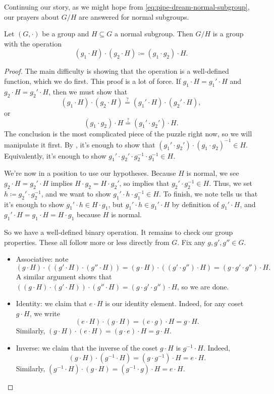 \documentclass[../main.tex]{subfiles}
\begin{document}
Continuing our story, as we might hope from \eqref{eq:pipe-dream-normal-subgroup}, our prayers about $G/H$ are answered for normal subgroups.
\begin{proposition}
    Let $(G,\cdot)$ be a group and $H\subseteq G$ a normal subgroup. Then $G/H$ is a group with the operation
    \[(g_1\cdot H)\cdot(g_2\cdot H)\coloneqq(g_1\cdot g_2)\cdot H.\]
\end{proposition}
\begin{proof}
    The main difficulty is showing that the operation is a well-defined function, which we do first. This proof is a lot of force. If $g_1\cdot H=g_1'\cdot H$ and $g_2\cdot H=g_2'\cdot H$, then we must show that
    \[(g_1\cdot H)\cdot(g_2\cdot H)\stackrel?=(g_1'\cdot H)\cdot(g_2'\cdot H),\]
    or
    \[(g_1\cdot g_2)\cdot H\stackrel?=(g_1'\cdot g_2')\cdot H.\]
    The conclusion is the most complicated piece of the puzzle right now, so we will manipulate it first. By , it's enough to show that $(g_1'\cdot g_2')\cdot(g_1\cdot g_2)^{-1}\in H$. Equivalently, it's enough to show $g_1'\cdot g_2'\cdot g_2^{-1}\cdot g_1^{-1}\in H$.
    
    We're now in a position to use our hypotheses. Because $H$ is normal, we see $g_2\cdot H=g_2'\cdot H$ implies $H\cdot g_2=H\cdot g_2'$, so  implies that $g_2'\cdot g_2^{-1}\in H$. Thus, we set $h\coloneqq g_2'\cdot g_2^{-1}$, and we want to show $g_1'\cdot h\cdot g_1^{-1}\in H$. To finish, we note  tells us that it's enough to show $g_1'\cdot h\in H\cdot g_1$, but $g_1'\cdot h\in g_1'\cdot H$ by definition of $g_1'\cdot H$, and $g_1'\cdot H=g_1\cdot H=H\cdot g_1$ because $H$ is normal.
    
    So we have a well-defined binary operation. It remains to check our group properties. These all follow more or less directly from $G$. Fix any $g,g',g''\in G$.
    \begin{itemize}
        \item Associative: note
        \[(g\cdot H)\cdot((g'\cdot H)\cdot(g''\cdot H))=(g\cdot H)\cdot((g'\cdot g'')\cdot H)=(g\cdot g'\cdot g'')\cdot H.\]
        A similar argument shows that $((g\cdot H)\cdot(g'\cdot H))\cdot(g''\cdot H)=(g\cdot g'\cdot g'')\cdot H$, so we are done.
        \item Identity: we claim that $e\cdot H$ is our identity element. Indeed, for any coset $g\cdot H$, we write
        \[(e\cdot H)\cdot(g\cdot H)=(e\cdot g)\cdot H=g\cdot H.\]
        Similarly, $(g\cdot H)\cdot(e\cdot H)=(g\cdot e)\cdot H=g\cdot H$.
        \item Inverse: we claim that the inverse of the coset $g\cdot H$ is $g^{-1}\cdot H$. Indeed,
        \[(g\cdot H)\cdot\left(g^{-1}\cdot H\right)=\left(g\cdot g^{-1}\right)\cdot H=e\cdot H.\]
        Similarly, $\left(g^{-1}\cdot H\right)\cdot(g\cdot H)=\left(g^{-1}\cdot g\right)\cdot H=e\cdot H$.
        \qedhere
    \end{itemize}
\end{proof}
\end{document}
